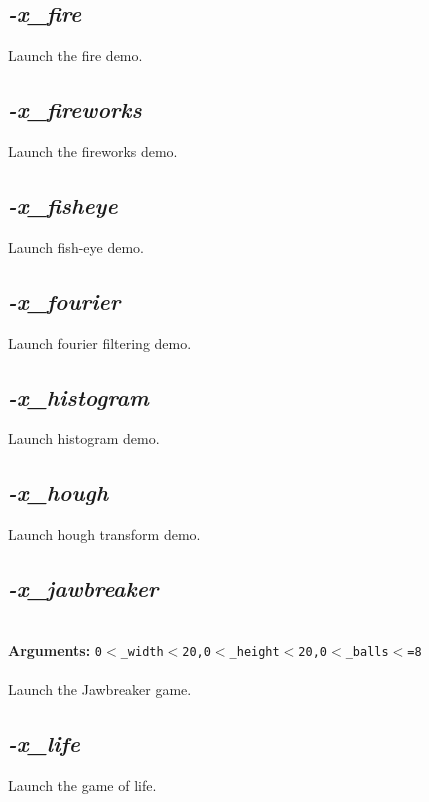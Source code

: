 \documentclass[a4paper,11pt,twoside]{book}
\begin{document}
\subsection{\emph{-x\_fire} }\vspace*{-0.5em}
Launch the fire demo.


\subsection{\emph{-x\_fireworks} }\vspace*{-0.5em}
Launch the fireworks demo.


\subsection{\emph{-x\_fisheye} }\vspace*{-0.5em}
Launch fish-eye demo.


\subsection{\emph{-x\_fourier} }\vspace*{-0.5em}
Launch fourier filtering demo.


\subsection{\emph{-x\_histogram} }\vspace*{-0.5em}
Launch histogram demo.


\subsection{\emph{-x\_hough} }\vspace*{-0.5em}
Launch hough transform demo.


\subsection{\emph{-x\_jawbreaker} }\vspace*{-0.5em}
~\\\textbf{Arguments: } 
{\small \texttt{0$<$\_width$<$20,0$<$\_height$<$20,0$<$\_balls$<$=8}}\\~\\
Launch the Jawbreaker game.


\subsection{\emph{-x\_life} }\vspace*{-0.5em}
Launch the game of life.
\end{document}
